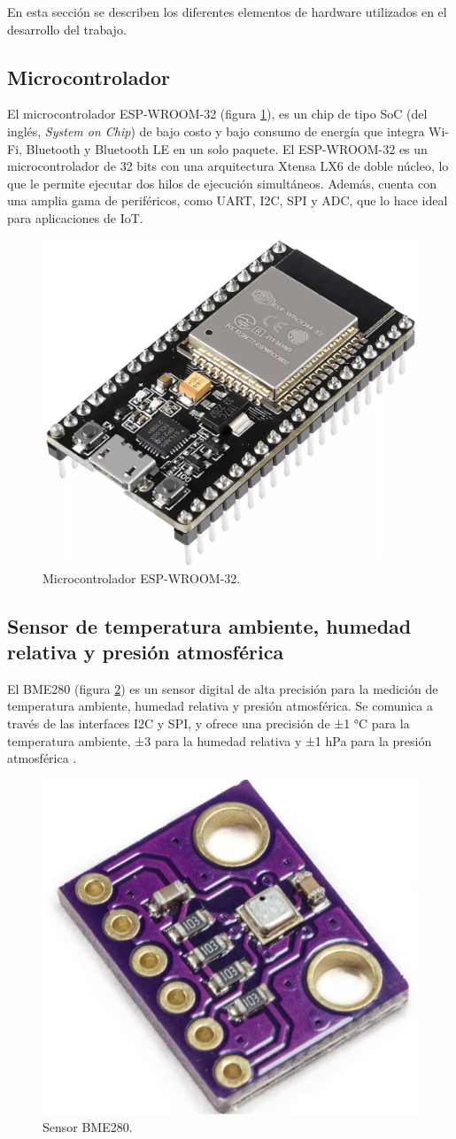 En esta sección se describen los diferentes elementos de hardware utilizados en
el desarrollo del trabajo.

\subsection{Microcontrolador}\label{sec:microcontrolador}

El microcontrolador ESP-WROOM-32 (figura \ref{fig:ESP32}), es un chip de tipo
SoC (del inglés, \textit{System on Chip}) de bajo costo y bajo consumo de
energía que integra Wi-Fi, Bluetooth y Bluetooth LE en un solo paquete. El
ESP-WROOM-32 \cite{EspressifESP32WROOM} es un microcontrolador de 32 bits con
una arquitectura Xtensa LX6 de doble núcleo, lo que le permite ejecutar dos
hilos de ejecución simultáneos. Además, cuenta con una amplia gama de
periféricos, como UART, I2C, SPI y ADC, que lo hace ideal para aplicaciones de
IoT.

\begin{figure}[H]
	\centering
	\includegraphics[height=.15\textwidth]{./Images/3.png}
	\caption{Microcontrolador ESP-WROOM-32\protect\footnotemark.}
	\label{fig:ESP32}
\end{figure}


\subsection{Sensor de temperatura ambiente, humedad relativa y presión atmosférica}

El BME280 (figura \ref{fig:BME280}) es un sensor digital de alta precisión para
la medición de temperatura ambiente, humedad relativa y presión atmosférica. Se
comunica a través de las interfaces I2C y SPI, y ofrece una precisión de ±1 °C
para la temperatura ambiente, ±3 \code{\%} para la humedad relativa y ±1 hPa
para la presión atmosférica \cite{BoschBME280}.

\begin{figure}[H]
	\centering
	\includegraphics[height=.15\textwidth]{./Images/4.png}
	\caption{Sensor BME280\protect\footnotemark.}
	\label{fig:BME280}
\end{figure}

